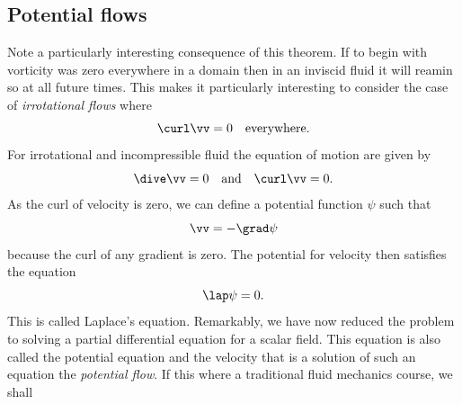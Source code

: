 \subsection{Potential flows}
Note a particularly interesting consequence of this theorem. If to
begin with vorticity was zero everywhere in a domain then in an
inviscid fluid it will reamin so at all future times. This makes it
particularly interesting to consider the case of \textit{irrotational
  flows} where
\begin{equation}
\curl \vv = 0 \quad \text{everywhere.}
\end{equation}
For irrotational and incompressible fluid the equation of motion are
given by 
\begin{equation}
\dive \vv = 0 \quad\text{and}\quad \curl\vv = 0  \/.
\label{A2.2:irro}
\end{equation}
As the curl of velocity is zero, we can define a potential function
$\psi$ such that 
\begin{equation}
\vv = - \grad \psi
\end{equation}
because the curl of any gradient is zero. 
The potential for velocity then satisfies the equation
\begin{equation}
\lap \psi = 0 \/.
\label{A2.2:Laplace}
\end{equation}
This is called Laplace's equation. Remarkably, we have now reduced the
problem to solving a partial differential equation for a scalar
field. This equation is also called the potential equation and the
velocity that is a solution of such an equation the \textit{potential
  flow}.  If this where a traditional fluid mechanics course, we shall
